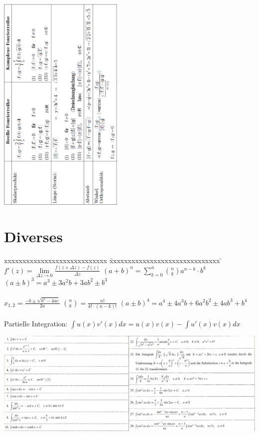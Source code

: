 \begin{minipage}{6cm}
	\includegraphics[width=6cm]{./bilder/vektor1.png}
\end{minipage}

\section{Diverses}
\begin{tabbing}
	xxxxxxxxxxxxxxxxxxxxxxxxxxxx \= xxxxxxxxxxxxxxxxxxxxxxxxxxxxxx \= \kill
 	$f'(z) = \lim \limits_{\Delta z \rightarrow 0} \frac{f(z + \Delta z) -
	f(z)}{\Delta z}$ \> $(a + b)^n = \sum_{k=0}^{n} \binom n k a^{n-k} \cdot b^k$ \>
	$(a \pm b)^3 =a^3 \pm  3 a^{2} b + 3 a b^2 \pm b^3 $\\ \\
	$x_{1,2} = \frac{-b \pm \sqrt{b^2 - 4ac}}{2a}$ \> $\binom n k = \frac{n!}{k!
	\cdot (n-k)!}$ \> $(a \pm b)^4 =a^4 \pm  4 a^{3} b + 6a^2b^2 \pm 4 a b^3 +
	b^4$\\ 
	\\Partielle Integration: $\int u(x) v'(x) dx = u(x)v(x) - \int u'(x) v(x) dx$
\end{tabbing}

\begin{center}
\includegraphics[width=18cm]{./bilder/integral1.png}
\end{center}


